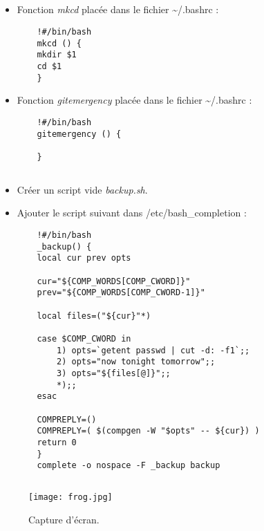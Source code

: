 \documentclass{article}
\begin{document}
\subsection{}

\begin{itemize}
    \item Fonction \emph{mkcd} placée dans le fichier \textasciitilde/.bashrc :
    \begin{lstlisting}
    !#/bin/bash
    mkcd () {
	mkdir $1
	cd $1
    }
    \end{lstlisting}
    \item Fonction \emph{gitemergency} placée dans le fichier \textasciitilde/.bashrc :
    \begin{lstlisting}
    !#/bin/bash
    gitemergency () {

    }
    \end{lstlisting}
\end{itemize}

\subsection{}

\begin{itemize}
    \item Créer un script vide \emph{backup.sh}.
    \item Ajouter le script suivant dans /etc/bash\_completion :
    \begin{lstlisting}
    !#/bin/bash
    _backup() {
    local cur prev opts

    cur="${COMP_WORDS[COMP_CWORD]}"
    prev="${COMP_WORDS[COMP_CWORD-1]}"

    local files=("${cur}"*)

    case $COMP_CWORD in
        1) opts=`getent passwd | cut -d: -f1`;;
        2) opts="now tonight tomorrow";;
        3) opts="${files[@]}";;
        *);;
    esac

    COMPREPLY=()
    COMPREPLY=( $(compgen -W "$opts" -- ${cur}) )
    return 0
    }
    complete -o nospace -F _backup backup
    \end{lstlisting}
\end{itemize}

\subsection{}

\begin{figure}[h]
\centering
\texttt{[image: frog.jpg]}
\caption{\label{fig:frog}Capture d'écran.}
\end{figure}
\end{document}
